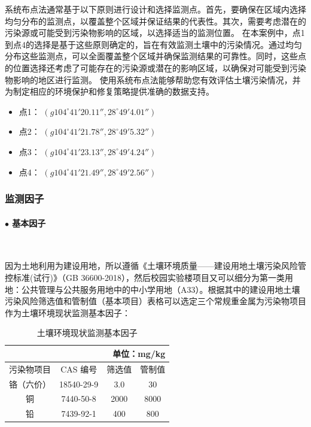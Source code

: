 系统布点法通常基于以下原则进行设计和选择监测点。首先，要确保在区域内选择均匀分布的监测点，以覆盖整个区域并保证结果的代表性。其次，需要考虑潜在的污染源或可能受到污染物影响的区域，以选择适当的监测位置。
在本案例中，点1到点4的选择是基于这些原则确定的，旨在有效监测土壤中的污染情况。通过均匀分布这些监测点，可以全面覆盖整个区域并确保监测结果的可靠性。同时，这些点的位置选择还考虑了可能存在的污染源或潜在的影响区域，以确保对可能受到污染物影响的地区进行监测。
使用系统布点法能够帮助您有效评估土壤污染情况，并为制定相应的环境保护和修复策略提供准确的数据支持。
\begin{itemize}
    \item 点1： $(g104^{\circ}41'20.11'',28^{\circ}49'4.01'')$
    \item 点2： $(g104^{\circ}41'21.78'',28^{\circ}49'5.32'')$
    \item 点3： $(g104^{\circ}41'23.13'',28^{\circ}49'4.24'')$
    \item 点4： $(g104^{\circ}41'21.49'',28^{\circ}49'2.56'')$
\end{itemize}



\subsubsection{监测因子}
\paragraph{$\bullet $ 基本因子}~{}\par
因为土地利用为建设用地，所以遵循《土壤环境质量——建设用地土壤污染风险管控标准(试行)》（GB 36600-2018），然后校园实验楼项目又可以细分为第一类用地：公共管理与公共服务用地中的中小学用地（A33）。根据其中的建设用地土壤污染风险筛选值和管制值（基本项目）表格可以选定三个常规重金属为污染物项目作为土壤环境现状监测基本因子：
\begin{table}[H]
    \centering
    \caption{土壤环境现状监测基本因子\cite{GB36600-2018}}
    \begin{tabular}{cccc}
    \multicolumn{4}{r}{单位：mg/kg} \\
    \toprule
    污染物项目 & CAS 编号 & 筛选值   & 管制值 \\
    \midrule
    铬（六价） & 18540-29-9 & 3.0   & 30 \\
    铜     & 7440-50-8 & 2000  & 8000 \\
    铅     & 7439-92-1 & 400   & 800 \\
    \bottomrule
    \end{tabular}
    \label{tab:Basic factors for monitoring the status of soil environment}
\end{table}

